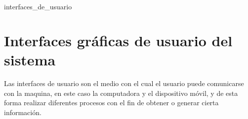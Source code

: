 interfaces_de_usuario
\section{Interfaces gráficas de usuario del sistema}
Las interfaces de usuario son el medio con el cual el usuario puede comunicarse con la maquina, en este caso la computadora y el dispositivo móvil, y de esta forma realizar diferentes procesos con el fin de obtener o generar cierta información.

\newpage

\newpage

\newpage

\newpage

\newpage

\newpage

\newpage

\newpage

\newpage

\newpage
